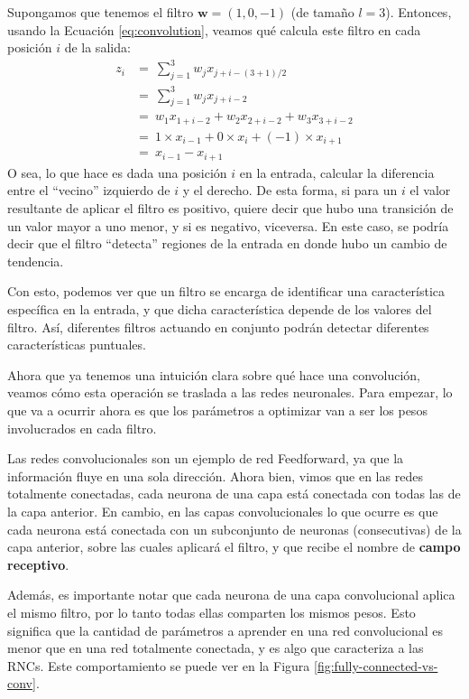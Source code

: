 \documentclass[../../main.tex]{subfiles}
\begin{document}
Supongamos que tenemos el filtro \(\bm{w} = (1, 0, -1)\) (de tamaño \(l=3\)). Entonces,
usando la Ecuación \ref{eq:convolution}, veamos qué calcula este filtro en cada
posición \(i\) de la salida:
\begin{align*}
    z_i &=\ \sum_{j=1}^3 w_j x_{j+i-(3+1)/2} \\
        &=\ \sum_{j=1}^3 w_j x_{j+i-2} \\
        &=\ w_1 x_{1+i-2} + w_2 x_{2+i-2} + w_3 x_{3+i-2} \\
        &=\ 1 \times x_{i-1} + 0 \times x_i + (-1) \times x_{i+1} \\
        &=\ x_{i-1} - x_{i+1}
\end{align*}
O sea, lo que hace es dada una posición \(i\) en la entrada, calcular la diferencia entre
el ``vecino'' izquierdo de \(i\) y el derecho. De esta forma, si para un \(i\) el valor
resultante de aplicar el filtro es positivo, quiere decir que hubo una transición de un
valor mayor a uno menor, y si es negativo, viceversa. En este caso, se podría decir que el
filtro ``detecta'' regiones de la entrada en donde hubo un cambio de tendencia.

Con esto, podemos ver que un filtro se encarga de identificar una característica
específica en la entrada, y que dicha característica depende de los valores del filtro.
Así, diferentes filtros actuando en conjunto podrán detectar diferentes características
puntuales.

Ahora que ya tenemos una intuición clara sobre qué hace una convolución, veamos
cómo esta operación se traslada a las redes neuronales. Para empezar, lo que va a
ocurrir ahora es que los parámetros a optimizar van a ser los pesos involucrados
en cada filtro.

Las redes convolucionales son un ejemplo de red Feedforward, ya que la información fluye
en una sola dirección. Ahora bien, vimos que en las redes totalmente conectadas, cada
neurona de una capa está conectada con todas las de la capa anterior. En cambio, en las
capas convolucionales lo que ocurre es que cada neurona está conectada con un subconjunto
de neuronas (consecutivas) de la capa anterior, sobre las cuales aplicará el filtro, y que
recibe el nombre de \textbf{campo receptivo}.

Además, es importante notar que cada neurona de una capa convolucional aplica el mismo
filtro, por lo tanto todas ellas comparten los mismos pesos. Esto significa que la
cantidad de parámetros a aprender en una red convolucional es menor que en una red
totalmente conectada, y es algo que caracteriza a las RNCs. Este comportamiento se puede
ver en la Figura \ref{fig:fully-connected-vs-conv}.
\end{document}
